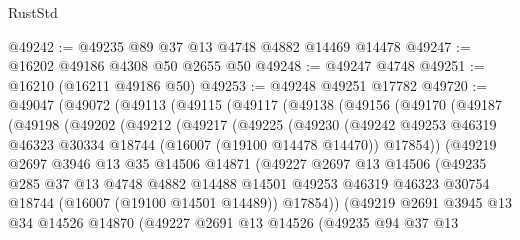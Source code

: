 \begin{lexlean}{RustStd}
\begin{coremodule}
@49242 := @49235 @89 @37 @13 @4748 @4882 @14469 @14478
@49247 := @16202 @49186 @4308 @50 @2655 @50
@49248 := @49247 @4748
@49251 := @16210 (@16211 @49186 @50)
@49253 := @49248 @49251 @17782
@49720 := @49047
    (@49072
      (@49113
        (@49115
          (@49117
            (@49138
              (@49156
                (@49170
                  (@49187
                    (@49198
                      (@49202
                        (@49212
                          (@49217
                            (@49225
                              (@49230
                                (@49242
                                  @49253
                                  @46319
                                  @46323
                                  @30334
                                  @18744
                                  (@16007 (@19100 @14478 @14470))
                                  @17854))
                              (@49219
                                @2697
                                @3946
                                @13
                                @35
                                @14506
                                @14871
                                (@49227
                                  @2697
                                  @13
                                  @14506
                                  (@49235
                                    @285
                                    @37
                                    @13
                                    @4748
                                    @4882
                                    @14488
                                    @14501
                                    @49253
                                    @46319
                                    @46323
                                    @30754
                                    @18744
                                    (@16007 (@19100 @14501 @14489))
                                    @17854))
                                (@49219
                                  @2691
                                  @3945
                                  @13
                                  @34
                                  @14526
                                  @14870
                                  (@49227
                                    @2691
                                    @13
                                    @14526
                                    (@49235
                                      @94
                                      @37
                                      @13

\end{coremodule}
\end{lexlean}
